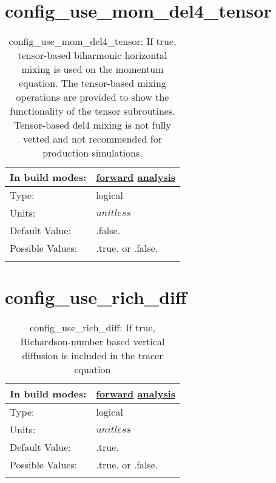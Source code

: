 \section[config\_use\_mom\_del4\_tensor]{config\_use\_mom\_del4\_tensor}
\label{sec:nm_sec_config_use_mom_del4_tensor}
\begin{center}
\begin{longtable}{| p{2.0in} || p{4.0in} |}
    \hline
    In build modes: & \hyperref[subsec:forward_nm_tab_hmix_del4_tensor]{forward} \hyperref[subsec:analysis_nm_tab_hmix_del4_tensor]{analysis} \\
    \hline
    Type: & logical \\
    \hline
    Units: & $unitless$ \\
    \hline
    Default Value: & .false. \\
    \hline
    Possible Values: & .true. or .false. \\
    \hline
    \caption{config\_use\_mom\_del4\_tensor: If true, tensor-based biharmonic horizontal mixing is used on the momentum equation. The tensor-based mixing operations are provided to show the functionality of the tensor subroutines. Tensor-based del4 mixing is not fully vetted and not recommended for production simulations.}
\end{longtable}
\end{center}
\section[config\_use\_rich\_diff]{config\_use\_rich\_diff}
\label{sec:nm_sec_config_use_rich_diff}
\begin{center}
\begin{longtable}{| p{2.0in} || p{4.0in} |}
    \hline
    In build modes: & \hyperref[subsec:forward_nm_tab_vmix_rich]{forward} \hyperref[subsec:analysis_nm_tab_vmix_rich]{analysis} \\
    \hline
    Type: & logical \\
    \hline
    Units: & $unitless$ \\
    \hline
    Default Value: & .true. \\
    \hline
    Possible Values: & .true. or .false. \\
    \hline
    \caption{config\_use\_rich\_diff: If true, Richardson-number based vertical diffusion is included in the tracer equation}
\end{longtable}
\end{center}
